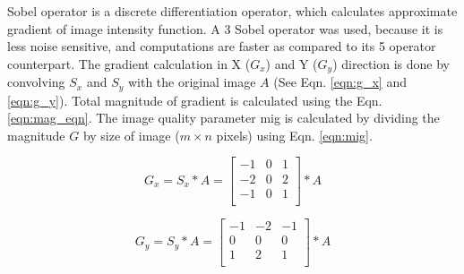             \vspace{5mm}
            \noindent Sobel operator is a discrete differentiation operator, which calculates approximate gradient of image intensity function. A 3  Sobel operator was used, because it is less noise sensitive, and computations are faster as compared to its 5  operator counterpart. The gradient calculation in X ($G_x$) and Y ($G_y$) direction is done by convolving $S_x$ and $S_y$ with the original image $A$ (See Eqn. \ref{eqn:g_x} and \ref{eqn:g_y}). Total magnitude of gradient is calculated using the Eqn. \ref{eqn:mag_eqn}. The image quality parameter \gls{mig} is calculated by dividing the magnitude $G$ by size of image (\( m \times n\) pixels) using Eqn. \ref{eqn:mig}. 
            

            \begin{equation}
                G_x = S_x * A = 
                \begin{bmatrix}
                    -1 & 0 & 1 \\
                    -2 & 0 & 2 \\
                    -1 & 0 & 1 \\
                \end{bmatrix} * A
                \label{eqn:g_x}
            \end{equation}

            \begin{equation}
                G_y = S_y * A = 
                \begin{bmatrix}
                    -1 & -2 & -1 \\
                    0 & 0 & 0 \\
                    1 & 2 & 1 \\
                \end{bmatrix} * A
                \label{eqn:g_y}
            \end{equation}

